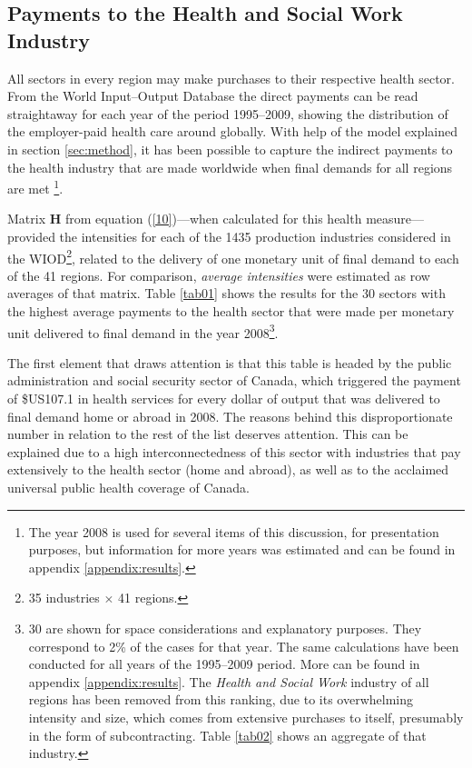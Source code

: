 \documentclass[a4paper,12pt, ]{article}
\begin{document}
\subsection{Payments to the Health and Social Work Industry}

All sectors in every region may make purchases to their respective health sector. From the World Input--Output Database the direct payments can be read straightaway for each year of the period 1995--2009, showing the distribution of the employer-paid health care around globally. With help of the model explained in section \ref{sec:method}, it has been possible to capture the indirect payments to the health industry that are made worldwide when final demands for all regions are met \footnote{The year 2008 is used for several items of this discussion, for presentation purposes, but information for more years was estimated and can be found in appendix \ref{appendix:results}.}.

Matrix $\mathbf{H}$ from equation (\ref{10})---when calculated for this health measure---provided the intensities for each of the 1435 production industries considered in the WIOD\footnote{35 industries $\times$ 41 regions.}, related to the delivery of one monetary unit of final demand to each of the 41 regions. For comparison, \textit{average intensities} were estimated as row averages of that matrix. Table \ref{tab01} shows the results for the 30 sectors with the highest average payments to the health sector that were made per monetary unit delivered to final demand in the year 2008\footnote{30 are shown for space considerations and explanatory purposes. They correspond to 2\% of the cases for that year. The same calculations have been conducted for all years of the 1995--2009 period. More can be found in appendix \ref{appendix:results}. The \textit{Health and Social Work} industry of all regions has been removed from this ranking, due to its overwhelming intensity and size, which comes from extensive purchases to itself, presumably in the form of subcontracting. Table \ref{tab02} shows an aggregate of that industry.}.  

The first element that draws attention is that this table is headed by the public administration and social security sector of Canada, which triggered the payment of \$US107.1 in health services for every dollar of output that was delivered to final demand home or abroad in 2008. The reasons behind this disproportionate number in relation to the rest of the list deserves attention. This can be explained due to a high interconnectedness of this sector with industries that pay extensively to the health sector (home and abroad), as well as to the acclaimed universal public health coverage of Canada.
\end{document}
